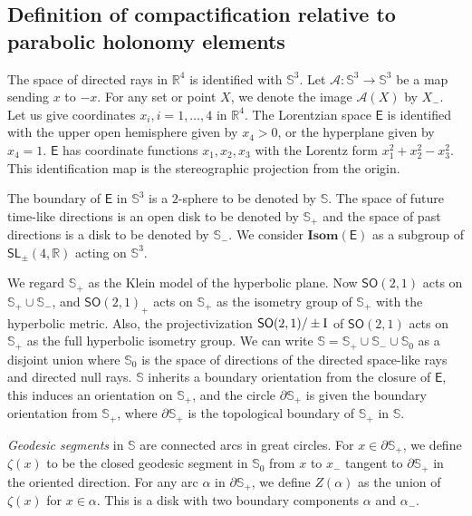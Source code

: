 \documentclass{amsart}
\numberwithin{equation}{section}
\newcommand\bR{{\mathbb{R}}}
\newcommand\SI{{\mathbb{S}}}
\newcommand\ra{\rightarrow}
\newcommand\Idd{{\rm I}}
\newcommand\Isom{{\mathbf{Isom}}}
\newcommand\SL{{\mathsf{SL}}}
\newcommand\SO{{\mathsf{SO}}}
\newcommand\Ss{{\mathbb{S}}}
\newcommand\Lspace{\mathsf E}
\theoremstyle{definition}
\theoremstyle{remark}
\begin{document}
\subsection{Definition of compactification relative to parabolic holonomy elements}\label{sub:rcomp}
The space of directed rays in $\bR^4$ is identified with $\SI^3$.
Let $\mathcal{A}: \SI^3 \ra \SI^3$ be a map sending $x$ to $-x$. 
For any set or point $X$, we denote the image $\mathcal{A}(X)$ by $X_-$.
Let us give coordinates $x_i, i=1, \dots, 4$ in $\bR^4$. 
The Lorentzian space $\Lspace$ is identified with the upper open hemisphere
given by $x_4> 0$, or the hyperplane given by $x_4=1$.
$\Lspace$ has coordinate functions $x_1, x_2, x_3$
with the Lorentz form $x_1^2 + x_2^2 - x_3^2$. 
This identification map is the stereographic projection from the origin.

The boundary of $\Lspace$ in $\SI^3$ 
is a $2$-sphere to be denoted by $\Ss$.
The space of future time-like directions is 
an open disk to be denoted by $\Ss_+$ 
and the space of past directions is a disk to be denoted by $\Ss_-$. 
We consider $\Isom(\Lspace)$ as a subgroup of 
$\SL_\pm(4, \bR)$ acting on $\SI^3$. 






We regard $\Ss_+$ as the Klein model of the hyperbolic plane. 
Now $\SO(2, 1)$ acts on $\Ss_+\cup \Ss_-$, and $\SO(2, 1)_+$ acts 
on $\Ss_+$ as the isometry group of $\Ss_+$ with the hyperbolic metric. 
Also, the projectivization $\SO(2, 1)/\pm \Idd$ of $\SO(2, 1)$ acts on $\Ss_+$ 
as the full hyperbolic isometry group. 
We can write $\Ss = \Ss_+ \cup \Ss_- \cup \Ss_0$ as a disjoint union where 
$\Ss_0$ is the space of directions of the directed space-like rays and 
directed null rays.
$\Ss$ inherits a boundary orientation from
the closure of $\Lspace$, this induces an orientation on 
$\Ss_+$, and the circle 
$\partial \Ss_+$ is given the boundary orientation from $\Ss_+$, 
where $\partial \Ss_+$ is the topological boundary of $\Ss_+$ in $\Ss$. 

{\em Geodesic segments} in $\Ss$ are connected arcs in great circles. 
For $x \in \partial \Ss_+$, we define $\zeta(x)$ to be the closed 
geodesic segment in $\Ss_0$ from $x$ to $x_-$ tangent to 
$\partial \Ss_+$ in the oriented direction.  
For any arc $\alpha$ in $\partial \Ss_+$, we define $Z(\alpha)$ as 
the union 
of $\zeta(x)$ for $x\in \alpha$. This is a disk with two boundary components 
$\alpha$ and $\alpha_-$. 
\end{document}
